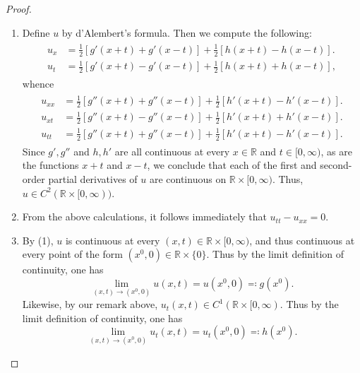 \documentclass{article}
\begin{document}
\begin{proof}
	$ $\newline \vspace{-0.65cm}
	\begin{enumerate}[itemsep =-2pt,label = (\roman{*})]
		\item Define $u$ by d'Alembert's formula. Then we compute the following: 
		\begin{align*}
			\begin{split}
				u_{x} &= \frac{1}{2}[g'(x + t) + g'(x - t)] + \frac{1}{2}[h(x + t) - h(x - t)]. \\
				u_{t} &= \frac{1}{2}[g'(x + t) -g'(x - t)] + \frac{1}{2}[h(x + t) + h(x - t)], 
			\end{split}
		\end{align*}
		whence 
		\begin{align*}
			\begin{split}
				u_{xx} &= \frac{1}{2}[g''(x + t) + g''(x - t)] + \frac{1}{2}[h'(x + t) - h'(x - t)]. \\ 
				u_{xt} &= \frac{1}{2}[g''(x + t) - g''(x - t)] + \frac{1}{2}[h'(x + t) + h'(x - t)].  \\
				u_{tt} &= \frac{1}{2}[g''(x + t) +  g''(x - t)] + \frac{1}{2}[h'(x + t) - h'(x - t)]. 
			\end{split}
		\end{align*}
		Since $g', g''$ and $h, h'$ are all continuous at every $x \in \mathbb{R}$ and $t \in [0, \infty)$, as are the functions $x + t$ and $x - t$, we conclude that each of the first and second-order partial derivatives of $u$ are continuous on $\mathbb{R} \times [0, \infty)$. Thus, $u \in C^{2}(\mathbb{R} \times [0,\infty))$. 
		\item From the above calculations, it follows immediately that $u_{tt} - u_{xx} = 0$. 
		\item By (1), $u$ is continuous at every $(x, t) \in \mathbb{R} \times [0, \infty)$, and thus continuous at every point of the form $(x^{0}, 0) \in \mathbb{R} \times \{0\}$. Thus by the limit definition of continuity, one has 
		\begin{equation*}
			\lim_{(x, t) \to (x^{0}, 0)}u(x, t) = u(x^{0}, 0) \eqqcolon g(x^{0}). 
		\end{equation*}
		Likewise, by our remark above, $u_{t}(x, t) \in C^{1}(\mathbb{R} \times [0, \infty)$. Thus by the limit definition of continuity, one has 
		\begin{equation*}
			\lim_{(x, t) \to (x^{0}, 0)} u_{t}(x, t) = u_{t}(x^{0}, 0) \eqqcolon h(x^{0}). 
		\end{equation*}
	\end{enumerate}
\end{proof}
\end{document}

